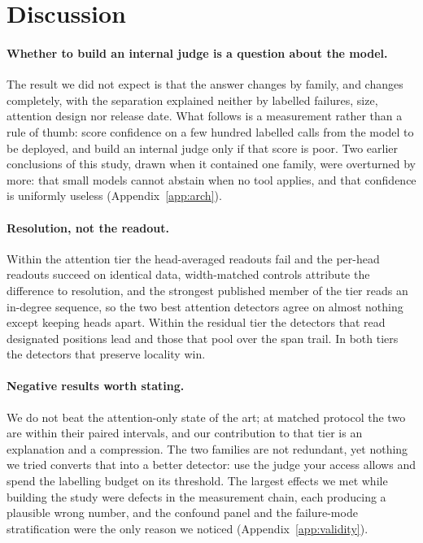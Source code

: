\section{Discussion}
\label{sec:disc}

\paragraph{Whether to build an internal judge is a question about the model.}
The result we did not expect is that the answer changes by family, and changes completely, with the
separation explained neither by labelled failures, size, attention design nor release date. What follows is a
measurement rather than a rule of thumb: score confidence on a few hundred labelled calls from the model to be
deployed, and build an internal judge only if that score is poor. Two earlier conclusions of this study,
drawn when it contained one family, were overturned by more: that small models cannot abstain when no tool
applies, and that confidence is uniformly useless (Appendix~\ref{app:arch}).

\paragraph{Resolution, not the readout.}
Within the attention tier the head-averaged readouts fail and the per-head readouts succeed on identical
data, width-matched controls attribute the difference to resolution, and the strongest published member of
the tier reads an in-degree sequence, so the two best attention detectors agree on almost nothing except
keeping heads apart. Within the residual tier the detectors that read designated positions lead and those
that pool over the span trail. In both tiers the detectors that preserve locality win.

\paragraph{Negative results worth stating.}
We do not beat the attention-only state of the art; at matched protocol the two are within their paired
intervals, and our contribution to that tier is an explanation and a compression. The two families are not
redundant, yet nothing we tried converts that into a better detector: use the judge your access allows and
spend the labelling budget on its threshold. The largest effects we met while building the study were defects
in the measurement chain, each producing a plausible wrong number, and the confound panel and the
failure-mode stratification were the only reason we noticed (Appendix~\ref{app:validity}).

